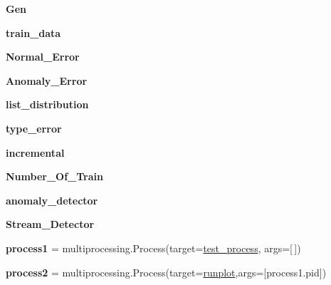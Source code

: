 \begin{DoxyCompactItemize}
\item 
{\bfseries Gen}\hypertarget{namespaceSAD_1_1Main_a3ef046510be4354252d318d1f6143d87}{}\label{namespaceSAD_1_1Main_a3ef046510be4354252d318d1f6143d87}

\item 
{\bfseries train\+\_\+data}\hypertarget{namespaceSAD_1_1Main_a7b5828c804bfb2e3b401ff0b940585f2}{}\label{namespaceSAD_1_1Main_a7b5828c804bfb2e3b401ff0b940585f2}

\item 
{\bfseries Normal\+\_\+\+Error}\hypertarget{namespaceSAD_1_1Main_a7d540f3c8d2b8355bdad8842b747b718}{}\label{namespaceSAD_1_1Main_a7d540f3c8d2b8355bdad8842b747b718}

\item 
{\bfseries Anomaly\+\_\+\+Error}\hypertarget{namespaceSAD_1_1Main_acf0319135f26ed567ed49b3cac366e44}{}\label{namespaceSAD_1_1Main_acf0319135f26ed567ed49b3cac366e44}

\item 
{\bfseries list\+\_\+distribution}\hypertarget{namespaceSAD_1_1Main_ac138b603946ded523a35ed03ee8b39e2}{}\label{namespaceSAD_1_1Main_ac138b603946ded523a35ed03ee8b39e2}

\item 
{\bfseries type\+\_\+error}\hypertarget{namespaceSAD_1_1Main_aecd878ea0dc3ef0afe4c134d5ab84f4a}{}\label{namespaceSAD_1_1Main_aecd878ea0dc3ef0afe4c134d5ab84f4a}

\item 
{\bfseries incremental}\hypertarget{namespaceSAD_1_1Main_a1aa4102c7ff041fd9090af46f69f1a47}{}\label{namespaceSAD_1_1Main_a1aa4102c7ff041fd9090af46f69f1a47}

\item 
{\bfseries Number\+\_\+\+Of\+\_\+\+Train}\hypertarget{namespaceSAD_1_1Main_a12b176a16cb15d7448f0400de16ff93e}{}\label{namespaceSAD_1_1Main_a12b176a16cb15d7448f0400de16ff93e}

\item 
{\bfseries anomaly\+\_\+detector}
\item 
{\bfseries Stream\+\_\+\+Detector}
\item 
{\bfseries process1} = multiprocessing.\+Process(target=\hyperlink{namespaceSAD_1_1Main_ac7af90e87d6b97c34a6c0a61050f7bbb}{test\+\_\+process}, args=\mbox{[}$\,$\mbox{]})\hypertarget{namespaceSAD_1_1Main_a6c35f644bd10ea0b8e3c78c4854f3ff5}{}\label{namespaceSAD_1_1Main_a6c35f644bd10ea0b8e3c78c4854f3ff5}

\item 
{\bfseries process2} = multiprocessing.\+Process(target=\hyperlink{namespaceSAD_1_1Main_a03f50b3953bf494084aa0db03de3106e}{runplot},args=\mbox{[}process1.\+pid\mbox{]})\hypertarget{namespaceSAD_1_1Main_ae8c63ae42a616f8b9791584a7a63c679}{}\label{namespaceSAD_1_1Main_ae8c63ae42a616f8b9791584a7a63c679}

\end{DoxyCompactItemize}


